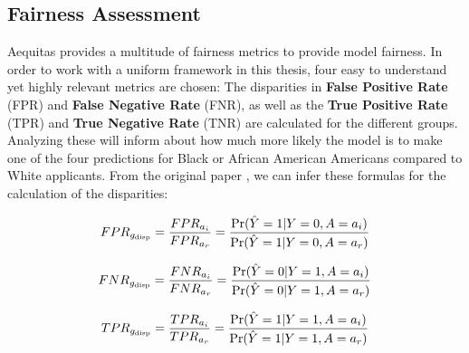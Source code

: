 \subsection{Fairness Assessment}\label{subsec:Fairness_Assessment}


Aequitas provides a multitude of fairness metrics to provide model fairness. In order to work with a uniform framework in this thesis, four easy to understand yet highly relevant metrics are chosen: 
The disparities in \textbf{False Positive Rate} (FPR) and \textbf{False Negative Rate} (FNR), as well as the \textbf{True Positive Rate} (TPR) and \textbf{True Negative Rate} (TNR) are calculated for the different groups.
Analyzing these will inform about how much more likely the model is to make one of the four predictions for Black or African American Americans compared to White applicants.
From the original paper \parencite{2018aequitas}, we can infer these formulas for the calculation of the disparities:

\begin{equation}
    FPR_{g_{\text{disp}}} = \frac{FPR_{a_i}}{FPR_{a_r}} = \frac{\Pr(\hat{Y}=1 | Y=0, A=a_i)}{\Pr(\hat{Y}=1 | Y=0, A=a_r)}
    \label{eq:FPR_Disparity}
    \addcontentsline{frm}{formulas}{\protect\numberline{\theequation}\hspace{1em}FPR Disparity}
\end{equation}

\begin{equation}
    FNR_{g_{\text{disp}}} = \frac{FNR_{a_i}}{FNR_{a_r}} = \frac{\Pr(\hat{Y}=0 | Y=1, A=a_i)}{\Pr(\hat{Y}=0 | Y=1, A=a_r)}
    \label{eq:FNR_Disparity}
    \addcontentsline{frm}{formulas}{\protect\numberline{\theequation}\hspace{1em}FNR Disparity}
\end{equation}

\begin{equation}
    TPR_{g_{\text{disp}}} = \frac{TPR_{a_i}}{TPR_{a_r}} = \frac{\Pr(\hat{Y}=1 | Y=1, A=a_i)}{\Pr(\hat{Y}=1 | Y=1, A=a_r)}
    \label{eq:TPR_Disparity}
    \addcontentsline{frm}{formulas}{\protect\numberline{\theequation}\hspace{1em}TPR Disparity}
\end{equation}

